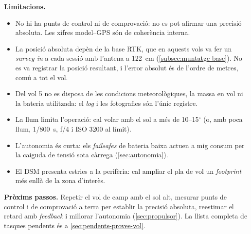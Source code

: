 \textbf{Limitacions.}
\begin{itemize}
    \item No hi ha punts de control ni de comprovació: no es pot afirmar una precisió absoluta. Les xifres model--GPS són de coherència interna.
    \item La posició absoluta depèn de la base RTK, que en aquests vols va fer un \emph{survey-in} a cada sessió amb l'antena a 122~cm (\cref{subsec:muntatge-base}). No es va registrar la posició resultant, i l'error absolut és de l'ordre de metres, comú a tot el vol.
    \item Del vol 5 no es disposa de les condicions meteorològiques, la massa en vol ni la bateria utilitzada: el \emph{log} i les fotografies són l'únic registre.
    \item La llum limita l'operació: cal volar amb el sol a més de 10--15$^{\circ}$ (o, amb poca llum, 1/800~s, f/4 i ISO 3200 al límit).
    \item L'autonomia és curta: els \emph{failsafes} de bateria baixa actuen a mig consum per la caiguda de tensió sota càrrega (\cref{sec:autonomia}).
    \item El DSM presenta estries a la perifèria: cal ampliar el pla de vol un \emph{footprint} més enllà de la zona d'interès.
\end{itemize}

\textbf{Pròxims passos.} Repetir el vol de camp amb el sol alt, mesurar punts de control i de comprovació a terra per establir la precisió absoluta, reestimar el retard amb \emph{feedback} i millorar l'autonomia (\cref{sec:propulsor}). La llista completa de tasques pendents és a \cref{sec:pendents-proves-vol}.

